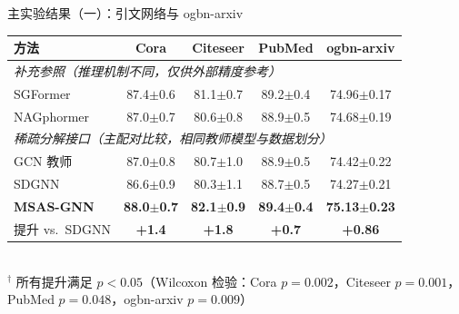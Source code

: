 \documentclass[aspectratio=169,9pt,xcolor=dvipsnames]{beamer}
\newcommand{\green}[1]{\textcolor{mygreen}{#1}}
\begin{document}
\begin{frame}{主实验结果（一）：引文网络与 ogbn-arxiv}
  \begin{center}\small
  \begin{tabular}{lcccc}
    \toprule
    \textbf{方法} & \textbf{Cora} & \textbf{Citeseer}
                  & \textbf{PubMed} & \textbf{ogbn-arxiv} \\
    \midrule
    \multicolumn{5}{l}{\footnotesize\textit{补充参照（推理机制不同，仅供外部精度参考）}}\\
    SGFormer      & 87.4$\pm$0.6 & 81.1$\pm$0.7 & 89.2$\pm$0.4 & 74.96$\pm$0.17\\
    NAGphormer    & 87.0$\pm$0.7 & 80.6$\pm$0.8 & 88.9$\pm$0.5 & 74.68$\pm$0.19\\
    \midrule
    \multicolumn{5}{l}{\footnotesize\textit{稀疏分解接口（主配对比较，相同教师模型与数据划分）}}\\
    GCN 教师      & 87.0$\pm$0.8 & 80.7$\pm$1.0 & 88.9$\pm$0.5 & 74.42$\pm$0.22\\
    SDGNN         & 86.6$\pm$0.9 & 80.3$\pm$1.1 & 88.7$\pm$0.5 & 74.27$\pm$0.21\\
    \textbf{MSAS-GNN}
                  & \textbf{88.0$\pm$0.7} & \textbf{82.1$\pm$0.9}
                  & \textbf{89.4$\pm$0.4} & \textbf{75.13$\pm$0.23}\\
    \midrule
    \green{提升 vs.\ SDGNN}
                  & \green{\textbf{+1.4}} & \green{\textbf{+1.8}}
                  & \green{\textbf{+0.7}} & \green{\textbf{+0.86}}\\
    \bottomrule
  \end{tabular}\\[2pt]
  \footnotesize$^\dagger$ 所有提升满足 $p<0.05$（Wilcoxon 检验：Cora $p\!=\!0.002$，Citeseer $p\!=\!0.001$，PubMed $p\!=\!0.048$，ogbn-arxiv $p\!=\!0.009$）
  \end{center}


\end{frame}
\end{document}
